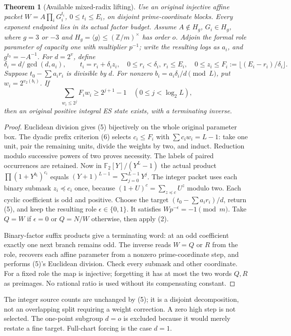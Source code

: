 \documentclass[10pt,a4paper]{article}
\newtheorem{theorem}{Theorem}
\begin{document}
\begin{theorem}[Available mixed-radix lifting]
Use an original injective affine packet
$W=A\prod_iG_i^{t_i}$, $0\le t_i\le E_i$, on disjoint prime-coordinate blocks.
Every exponent endpoint lies in its actual factor budget. Assume
$A\notin H_g$, $G_i\in H_g$, where $g=3$ or $-3$ and
$H_g=\langle g\rangle\le(\mathbb Z/m)^\times$ has order $o$.
Adjoin the formal role parameter of capacity one with multiplier $p^{-1}$;
write the resulting logs as $a_i$, and $g^{t_0}=-A^{-1}$.
For $d=2^v$, define
\[
 \delta_i=d/\gcd(d,a_i),\qquad
 t_i=r_i+\delta_i z_i,\quad0\le r_i<\delta_i,\ r_i\le E_i,
 \quad 0\le z_i\le F_i:=\lfloor(E_i-r_i)/\delta_i\rfloor.  \tag{5}
\]
Suppose $t_0-\sum a_ir_i$ is divisible by $d$. For nonzero
$b_i=a_i\delta_i/d\pmod L$, put $w_i=2^{v_2(b_i)}$. If
\[
 \sum_{w_i\le2^j}F_iw_i\ge2^{j+1}-1\quad(0\le j<\log_2L), \tag{6}
\]
then an original positive integral ES state exists, with a terminating inverse.
\end{theorem}
\begin{proof}
Euclidean division gives (5) bijectively on the whole original parameter box.
The dyadic prefix criterion (6) selects $c_i\le F_i$ with
$\sum c_iw_i=L-1$: take one unit, pair the remaining units, divide the weights
by two, and induct. Reduction modulo successive powers of two proves necessity.
The labels of paired occurrences are retained.
Now in $\mathbb F_2[Y]/(Y^L-1)$ the actual product
$\prod(1+Y^{b_i})^{c_i}$ equals $(Y+1)^{L-1}=\sum_{j=0}^{L-1}Y^j$.
The integer packet uses each binary submask $z_i\preceq c_i$ once, because
$(1+U)^c=\sum_{z\preceq c}U^z$ modulo two. Each cyclic coefficient is odd and
positive. Choose the target $(t_0-\sum a_ir_i)/d$, return (5), and keep the
resulting role $\epsilon\in\{0,1\}$. It satisfies $Wp^{-\epsilon}=-1\pmod m$.
Take $Q=W$ if $\epsilon=0$ or $Q=N/W$ otherwise, then apply (2).

Binary-factor suffix products give a terminating word: at an odd coefficient
exactly one next branch remains odd. The inverse reads $W=Q$ or $R$ from the
role, recovers each affine parameter from a nonzero prime-coordinate step,
and performs (5)'s Euclidean division. Check every submask and other coordinate.
For a fixed role the map is injective; forgetting it has at most the two words
$Q,R$ as preimages. No rational ratio is used without its compensating constant.
\end{proof}
The integer source counts are unchanged by (5); it is a disjoint decomposition,
not an overlapping split requiring a weight correction. A zero high step is
not selected. The one-point subgroup $d=o$ is excluded because it would merely
restate a fine target. Full-chart forcing is the case $d=1$.
\end{document}
